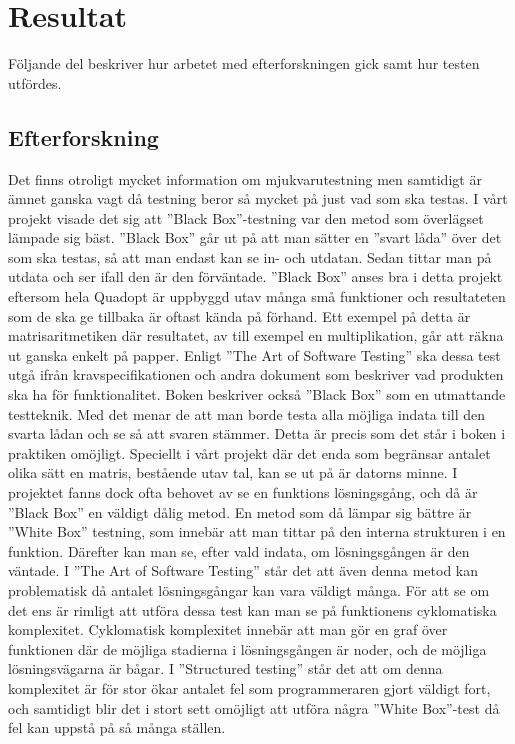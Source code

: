 \section{Resultat}	
	Följande del beskriver hur arbetet med efterforskningen gick samt hur testen utfördes.
	\subsection{Efterforskning}
	Det finns otroligt mycket information om mjukvarutestning men samtidigt är ämnet ganska vagt då testning beror så mycket på just vad som ska testas. I vårt projekt visade det sig att ''Black Box''-testning var den metod som överlägset lämpade sig bäst. ''Black Box'' går ut på att man sätter en ''svart låda'' över det som ska testas, så att man endast kan se in- och utdatan. Sedan tittar man på utdata och ser ifall den är den förväntade. ''Black Box'' anses bra i detta projekt eftersom hela Quadopt är uppbyggd utav många små funktioner och resultateten som de ska ge tillbaka är oftast kända på förhand. Ett exempel på detta är matrisaritmetiken där resultatet, av till exempel en multiplikation, går att räkna ut ganska enkelt på papper. Enligt ''The Art of Software Testing'' ska dessa test utgå ifrån kravspecifikationen och andra dokument som beskriver vad produkten ska ha för funktionalitet. Boken beskriver också ''Black Box'' som en utmattande testteknik. Med det menar de att man borde testa alla möjliga indata till den svarta lådan och se så att svaren stämmer. Detta är precis som det står i boken i praktiken omöjligt. Speciellt i vårt projekt där det enda som begränsar antalet olika sätt en matris, bestående utav tal, kan se ut på är datorns minne. \newline
I projektet fanns dock ofta behovet av se en funktions lösningsgång, och då är ''Black Box'' en väldigt dålig metod. En metod som då lämpar sig bättre är ''White Box'' testning, som innebär att man tittar på den interna strukturen i en funktion. Därefter kan man se, efter vald indata, om lösningsgången är den väntade. I ''The Art of Software Testing'' står det att även denna metod kan problematisk då antalet lösningsgångar kan vara väldigt många. För att se om det ens är rimligt att utföra dessa test kan man se på funktionens cyklomatiska komplexitet. Cyklomatisk komplexitet innebär att man gör en graf över funktionen där de möjliga stadierna i lösningsgången är noder, och de möjliga lösningsvägarna är bågar. I ''Structured testing'' \citep{structest} står det att om denna komplexitet är för stor ökar antalet fel som programmeraren gjort väldigt fort, och samtidigt blir det i stort sett omöjligt att utföra några ''White Box''-test då fel kan uppstå på så många ställen. \\ 	
